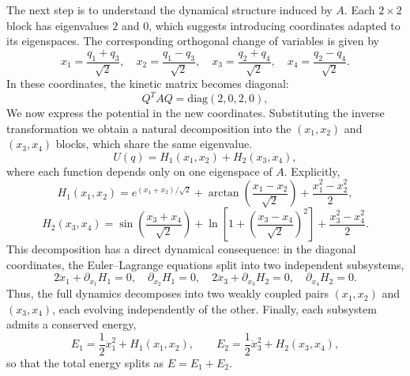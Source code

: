\documentclass{rendiconti}
\begin{document}
The next step is to understand the dynamical structure induced by $A$. Each $2\times 2$ block has eigenvalues $2$ and $0$, which suggests introducing coordinates adapted to its eigenspaces. The corresponding orthogonal change of variables is given by
\begin{equation}
x_1 = \frac{q_1+q_3}{\sqrt{2}}, \quad
x_2 = \frac{q_1-q_3}{\sqrt{2}}, \quad
x_3 = \frac{q_2+q_4}{\sqrt{2}}, \quad
x_4 = \frac{q_2-q_4}{\sqrt{2}}.
\end{equation}
In these coordinates, the kinetic matrix becomes diagonal:
\begin{equation}
Q^T A Q = \mathrm{diag}(2,0,2,0),
\end{equation}
We now express the potential in the new coordinates. Substituting the inverse transformation
we obtain a natural decomposition into the $(x_1,x_2)$ and $(x_3,x_4)$ blocks, which share the same eigenvalue.
\begin{equation}
U(q) = H_1(x_1,x_2) + H_2(x_3,x_4),
\end{equation}
where each function depends only on one eigenspace of $A$. Explicitly,
\begin{equation}
H_1(x_1,x_2)
= e^{(x_1+x_2)/\sqrt{2}}
+ \arctan\!\left(\frac{x_1-x_2}{\sqrt{2}}\right)
+ \frac{x_1^2 - x_2^2}{2},
\end{equation}
\begin{equation}
H_2(x_3,x_4)
= \sin\!\left(\frac{x_3+x_4}{\sqrt{2}}\right)
+ \ln\!\left[1+\left(\frac{x_3-x_4}{\sqrt{2}}\right)^2\right]
+ \frac{x_3^2 - x_4^2}{2}.
\end{equation}
This decomposition has a direct dynamical consequence: in the diagonal coordinates, the Euler--Lagrange equations split into two independent subsystems,
\begin{equation}
2 \ddot x_1 + \partial_{x_1}H_1 = 0, \quad
\partial_{x_2} H_1 = 0,\quad
2 \ddot x_3 + \partial_{x_3} H_2 = 0, \quad
\partial_{x_4} H_2 = 0.
\end{equation}
Thus, the full dynamics decomposes into two weakly coupled pairs $(x_1,x_2)$ and $(x_3,x_4)$, each evolving independently of the other.
Finally, each subsystem admits a conserved energy,
\begin{equation}
E_1 = \frac12 \dot x_1^2 + H_1(x_1,x_2), \qquad
E_2 = \frac12 \dot x_3^2 + H_2(x_3,x_4),
\end{equation}
so that the total energy splits as $E = E_1 + E_2$.
\end{document}
